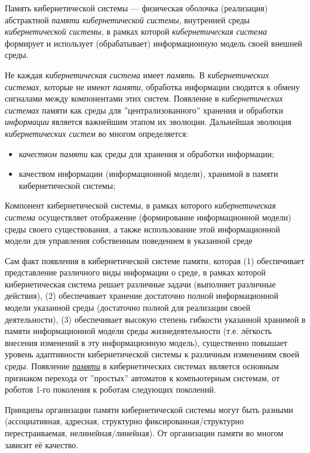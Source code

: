 Память кибернетической системы --- физическая оболочка (реализация) абстрактной \textit{памяти кибернетической системы}, внутренней среды \textit{кибернетической системы}, в рамках которой \textit{кибернетическая система} формирует и использует (обрабатывает) информационную модель своей внешней среды.

Не каждая \textit{кибернетическая система} имеет \textit{память}. 
В \textit{кибернетических системах}, которые не имеют \textit{памяти}, обработка информации сводится к обмену сигналами между компонентами этих систем. Появление в \textit{кибернетических системах} памяти как среды для ''централизованного''{} хранения и обработки \textit{информации} является важнейшим этапом их эволюции. Дальнейшая эволюция \textit{кибернетических систем} во многом определяется:
\begin{itemize}
	\item \textit{качеством памяти} как среды для хранения и обработки информации;
	\item качеством информации (информационной модели), хранимой в памяти кибернетической системы;
\end{itemize}

Компонент кибернетической системы, в рамках которого \textit{кибернетическая система} осуществляет отображение (формирование информационной модели) среды своего существования, а также использование этой информационной модели для управления собственным поведением в указанной среде

Сам факт появления в кибернетической системе памяти, которая (1) обеспечивает представление различного виды информации о среде, в рамках которой кибернетическая система решает различные задачи (выполняет различные действия), (2) обеспечивает хранение достаточно полной информационной модели указанной среды (достаточно полной для реализации своей деятельности), (3) обеспечивает высокую степень гибкости указанной хранимой в памяти информационной модели среды жизнедеятельности (т.е. лёгкость внесения изменений в эту информационную модель), существенно повышает уровень адаптивности кибернетической системы к различным изменениям своей среды.
Появление{} \uline{\textit{памяти}} в кибернетических системах является основным признаком перехода от ''простых''{} автоматов к компьютерным системам, от роботов 1-го поколения к роботам следующих поколений.

Принципы организации памяти кибернетической системы могут быть разными (ассоциативная, адресная, структурно фиксированная/структурно перестраиваемая, нелинейная/линейная). 
От организации памяти во многом зависит её качество.

